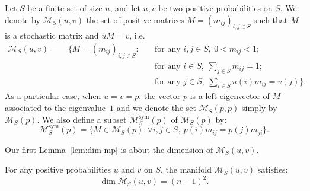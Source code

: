 \documentclass[AHL,Unicode,longabstracts]{cedram}
\newcounter{a}
\DeclareMathOperator{\sym}{sym}
\let\oldforall\forall
\renewcommand*{\forall}{\mathrel{\oldforall}}
\begin{document}
Let $S$ be a finite set of size $n$, and let $u,v$ be two positive probabilities on $S$. We denote by $\mathcal{M}_S(u,v)$ the set of positive matrices $M = (m_{ij})_{i,j \in S}$ such that $M$ is a stochastic matrix and $uM=v$, i.e.
\begin{align*}
\mathcal{M}_S(u,v) = \quad \{ M = (m_{ij})_{i,j \in S} : & \quad \text{for any } i,j \in S,\ 0 < m_{ij} < 1;\\
& \quad \text{for any } i \in S,\ \sum_{j\in S} m_{ij} = 1;\\
& \quad \text{for any } j \in S,\ \sum_{i\in S} u(i) m_{ij} = v(j)\}.
\end{align*}
As a particular case, when $u=v=p$, the vector $p$ is a left-eigenvector of $M$ associated to the eigenvalue~$1$ and we denote the set $\mathcal{M}_S(p,p)$ simply by $\mathcal{M}_S(p)$. We also define a subset $\mathcal{M}^{\sym}_S(p)$ of $\mathcal{M}_S(p)$ by:
\begin{equation*}
\mathcal{M}^{\sym}_S(p) = \{ M \in \mathcal{M}_S(p) : \forall i,j \in S,\ p(i) m_{ij} = p(j) m_{ji}\}.
\end{equation*}

Our first Lemma~\ref{lem:dim-mp} is about the dimension of $\mathcal{M}_S(u,v)$.

\begin{lemm}\label{lem:dim-mp}
For any positive probabilities $u$ and $v$ on $S$, the manifold $\mathcal{M}_S(u,v)$ satisfies:
\begin{equation*}
\dim \mathcal{M}_S(u,v) = (n-1)^2.
\end{equation*}
\end{lemm}
\end{document}
